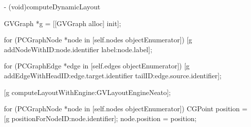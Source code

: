 \begin{objc}
- (void)computeDynamicLayout
{
    GVGraph *g = [[GVGraph alloc] init];
    
    for (PCGraphNode *node in [self.nodes objectEnumerator]) {
        [g addNodeWithID:node.identifier label:node.label];
    }
    
    for (PCGraphEdge *edge in [self.edges objectEnumerator]) {
        [g addEdgeWithHeadID:edge.target.identifier tailID:edge.source.identifier];
    }
    
    [g computeLayoutWithEngine:GVLayoutEngineNeato];
    
    for (PCGraphNode *node in [self.nodes objectEnumerator]) {
        CGPoint position = [g positionForNodeID:node.identifier];
        node.position = position;
    }
}
\end{objc}

